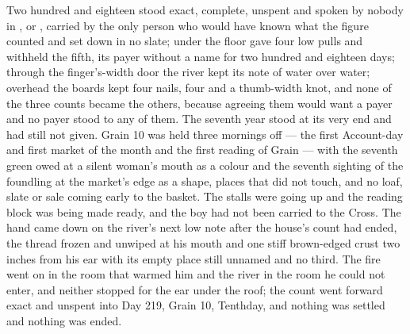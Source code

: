 Two hundred and eighteen stood exact, complete, unspent and spoken by nobody in ,  or , carried by the only person who would have known what the figure counted and set down in no slate; under the floor  gave four low pulls and withheld the fifth, its payer without a name for two hundred and eighteen days; through the finger's-width door the river kept its note of water over water; overhead the boards kept four nails, four and a thumb-width knot, and none of the three counts became the others, because agreeing them would want a payer and no payer stood to any of them. The seventh year stood at its very end and had still not given. Grain 10 was held three mornings off --- the first Account-day and first market of the month and the first reading of Grain --- with the seventh green owed at a silent woman's mouth as a colour and the seventh sighting of the foundling at the market's edge as a shape, places that did not touch, and no loaf, slate or sale coming early to the basket. The stalls were going up and the reading block was being made ready, and the boy had not been carried to the Cross. The hand came down on the river's next low note after the house's count had ended, the thread frozen and unwiped at his mouth and one stiff brown-edged crust two inches from his ear with its empty place still unnamed and no third. The fire went on in the room that warmed him and the river in the room he could not enter, and neither stopped for the ear under the roof; the count went forward exact and unspent into Day 219, Grain 10, Tenthday, and nothing was settled and nothing was ended.
